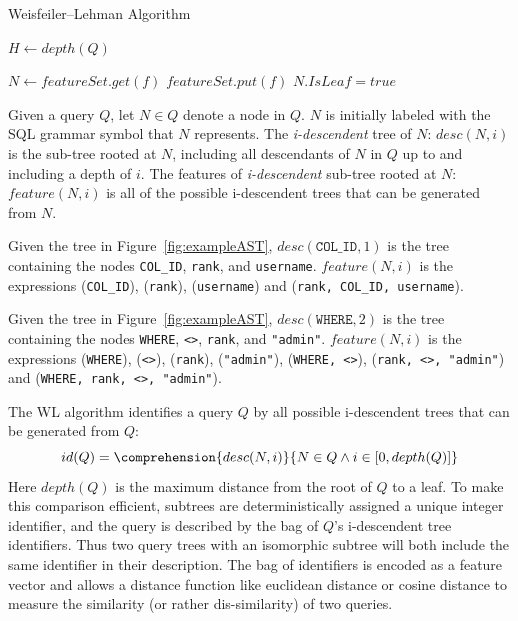 \begin{algorithm}
	\caption{Weisfeiler--Lehman Algorithm}
	\label{alg:WLAlgorithm}
	\begin{algorithmic}[1]
				\State $H \gets depth(Q)$
						\State \begin{varwidth}[t]{\linewidth} $f \gets$ CreateFeature(\par
						\hskip\algorithmicindent expressions in \{N~$\bigcup$ $\forall$ N.children\})
						\end{varwidth}
							\State $N \gets featureSet.get(f)$
						\Else
							\State $featureSet.put(f)$
						\EndIf
							\State $N.IsLeaf = true$
						\EndIf
					\EndFor
				\EndFor
			\EndFor
		\EndProcedure
	\end{algorithmic}
\end{algorithm}

Given a query $Q$, let $N \in Q$ denote a node in $Q$.  $N$ is initially labeled with the SQL grammar symbol that $N$ represents.
The \textit{i-descendent} tree of $N$: $desc(N, i)$ is the sub-tree rooted at $N$, including all descendants of $N$ in $Q$ up to and including a depth of $i$. The features of \textit{i-descendent} sub-tree rooted at $N$: $feature(N, i)$ is all of the possible i-descendent trees that can be generated from $N$. 

\begin{example}
Given the tree in Figure~\ref{fig:exampleAST}, 
$desc(\texttt{COL\_ID}, 1)$ is the tree containing the nodes \texttt{COL\_ID}, \texttt{rank}, and \texttt{username}. $feature(N, i)$ is the expressions (\texttt{COL\_ID}), (\texttt{rank}), (\texttt{username}) and (\texttt{rank, COL\_ID, username}).
\end{example}

\begin{example}
Given the tree in Figure~\ref{fig:exampleAST}, 
$desc(\texttt{WHERE}, 2)$ is the tree containing the nodes \texttt{WHERE}, \texttt{<>}, \texttt{rank}, and \texttt{"admin"}. $feature(N, i)$ is the expressions (\texttt{WHERE}), (\texttt{<>}), (\texttt{rank}), (\texttt{"admin"}), (\texttt{WHERE, <>}), (\texttt{rank, <>, "admin"}) and (\texttt{WHERE, rank, <>, "admin"}).
\end{example}


The WL algorithm identifies a query $Q$ by all possible i-descendent trees that can be generated from $Q$:
$$id(Q) = \comprehension{desc(N, i)}{N \in Q \wedge i \in [0, depth(Q)]}$$
Here $depth(Q)$ is the maximum distance from the root of $Q$ to a leaf. To make this comparison efficient, subtrees are deterministically assigned a unique integer identifier, and the query is described by the bag of $Q$'s i-descendent tree identifiers.  Thus two query trees with an isomorphic subtree will both include the same identifier in their description.
The bag of identifiers is encoded as a feature vector and allows a distance function like euclidean distance or cosine distance to measure the similarity (or rather dis-similarity) of two queries.

